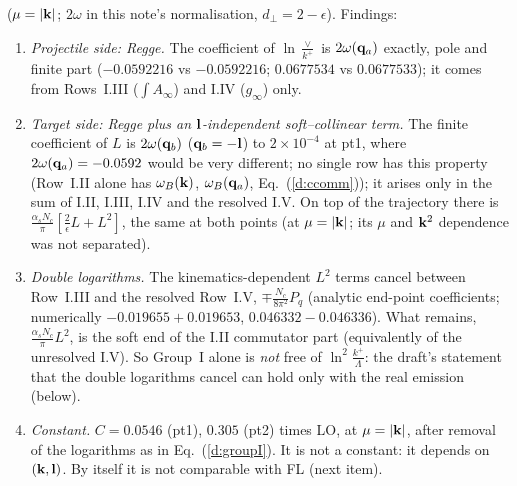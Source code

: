 ($\mu=|\mathbf{k}|$; $2\omega$ in this note's normalisation, $d_\perp=2-\epsilon$). Findings:
\begin{enumerate}
\item \emph{Projectile side: Regge.} The coefficient of $\ln\frac\vee{k^+}$ is $2\omega(\mathbf{q}_a)$ exactly, pole and finite part ($-0.0592216$ vs $-0.0592216$; $0.0677534$ vs $0.0677533$); it comes from Rows~I.III ($\int A_\infty$) and I.IV ($g_\infty$) only.
\item \emph{Target side: Regge plus an $\mathbf{l}$-independent soft--collinear term.} The finite coefficient of $L$ is $2\omega(\mathbf{q}_b)$ ($\mathbf{q}_b=-\mathbf{l}$) to $2\times10^{-4}$ at pt1, where $2\omega(\mathbf{q}_a)=-0.0592$ would be very different; no single row has this property (Row~I.II alone has $\omega_B(\mathbf{k})$, $\omega_B(\mathbf{q}_a)$, Eq.~(\ref{d:ccomm})); it arises only in the sum of I.II, I.III, I.IV and the resolved I.V. On top of the trajectory there is $\frac{\alpha_sN_c}{\pi}[\frac2\epsilon L+L^2]$, the same at both points (at $\mu=|\mathbf{k}|$; its $\mu$ and $\mathbf{k}^2$ dependence was not separated).
\item \emph{Double logarithms.} The kinematics-dependent $L^2$ terms cancel between Row~I.III and the resolved Row~I.V, $\mp\frac{N_c}{8\pi^2}P_q$ (analytic end-point coefficients; numerically $-0.019655+0.019653$, $0.046332-0.046336$). What remains, $\frac{\alpha_sN_c}{\pi}L^2$, is the soft end of the I.II commutator part (equivalently of the unresolved I.V). So Group~I alone is \emph{not} free of $\ln^2\frac{k^+}{\Lambda}$: the draft's statement that the double logarithms cancel can hold only with the real emission (below).
\item \emph{Constant.} $C=0.0546$ (pt1), $0.305$ (pt2) times LO, at $\mu=|\mathbf{k}|$, after removal of the logarithms as in Eq.~(\ref{d:groupI}). It is not a constant: it depends on $(\mathbf{k},\mathbf{l})$. By itself it is not comparable with FL (next item).
\end{enumerate}

